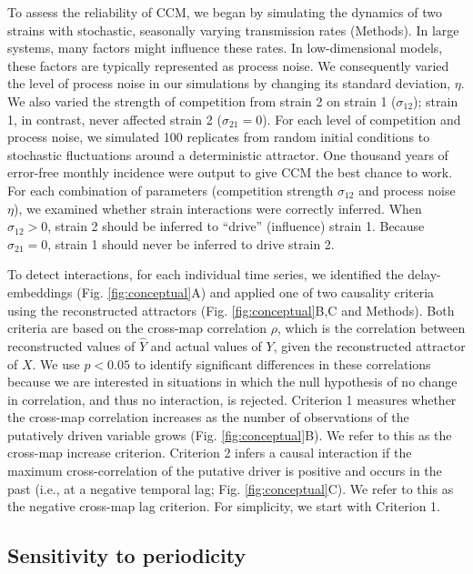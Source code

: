 To assess the reliability of CCM, we began by simulating the dynamics of two strains with stochastic, seasonally varying transmission rates (Methods).
In large systems, many factors might influence these rates.
In low-dimensional models, these factors are typically represented as process noise.
We consequently varied the level of process noise in our simulations by changing its standard deviation, $\eta$.
We also varied the strength of competition from strain 2 on strain 1 ($\sigma_{12}$); strain 1, in contrast, never affected strain 2 ($\sigma_{21}=0$).
For each level of competition and process noise, we simulated 100 replicates from random initial conditions to stochastic fluctuations around a deterministic attractor.
One thousand years of error-free monthly incidence were output to give CCM the best chance to work.
For each combination of parameters (competition strength $\sigma_{12}$ and process noise $\eta$), we examined whether strain interactions were correctly inferred.
When $\sigma_{12} >0$, strain 2 should be inferred to ``drive'' (influence) strain 1. 
Because $\sigma_{21}=0$, strain 1 should never be inferred to drive strain 2. 

To detect interactions, for each individual time series, we identified the delay-embeddings (Fig. \ref{fig:conceptual}A) and applied one of two causality criteria using the reconstructed attractors (Fig. \ref{fig:conceptual}B,C and Methods). 
Both criteria are based on the cross-map correlation $\rho$, which is the correlation between reconstructed values of $\hat{Y}$ and actual values of $Y$, given the reconstructed attractor of $X$.
We use $p < 0.05$ to identify significant differences in these correlations because we are interested in situations in which the null hypothesis of no change in correlation, and thus no interaction, is rejected.
Criterion 1 \cite{Sugihara2012, Clark2015} measures whether the cross-map correlation increases as the number of observations of the putatively driven variable grows (Fig. \ref{fig:conceptual}B).
We refer to this as the cross-map increase criterion.
Criterion 2 \cite{Ye2015} infers a causal interaction if the maximum cross-correlation of the putative driver is positive and occurs in the past (i.e., at a negative temporal lag; Fig. \ref{fig:conceptual}C).
We refer to this as the negative cross-map lag criterion.
For simplicity, we start with Criterion 1.


\subsection*{Sensitivity to periodicity}

